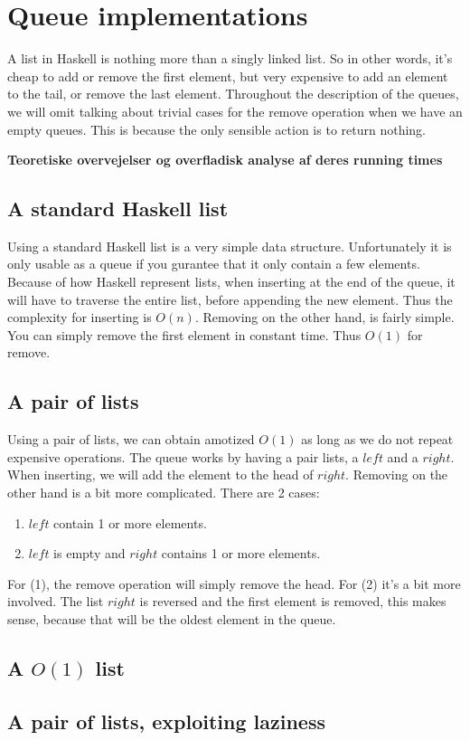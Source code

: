 \section*{Queue implementations}
A list in Haskell is nothing more than a singly linked list. So in other words, it's cheap to add or remove the first element, but very expensive to add an element to the tail, or remove the last element. Throughout the description of the queues, we will omit talking about trivial cases for the remove operation when we have an empty queues. This is because the only sensible action is to return nothing.

\textbf{Teoretiske overvejelser og overfladisk analyse af deres running times}

\subsection*{A standard Haskell list}
Using a standard Haskell list is a very simple data structure. Unfortunately it is only usable as a queue if you gurantee that it only contain a few elements. Because of how Haskell represent lists, when inserting at the end of the queue, it will have to traverse the entire list, before appending the new element. Thus the complexity for inserting is $O(n)$. Removing on the other hand, is fairly simple. You can simply remove the first element in constant time. Thus $O(1)$ for remove.

\subsection*{A pair of lists}
Using a pair of lists, we can obtain amotized $O(1)$ as long as we do not repeat expensive operations. The queue works by having a pair lists, a $left$ and a $right$. When inserting, we will add the element to the head of $right$. Removing on the other hand is a bit more complicated. There are 2 cases:
\begin{enumerate}
	\item $left$ contain 1 or more elements.
	\item $left$ is empty and $right$ contains 1 or more elements.
\end{enumerate}
For (1), the remove operation will simply remove the head. For (2) it's a bit more involved. The list $right$ is reversed and the first element is removed, this makes sense, because that will be the oldest element in the queue.
\subsection*{A $O(1)$ list}
\subsection*{A pair of lists, exploiting laziness}